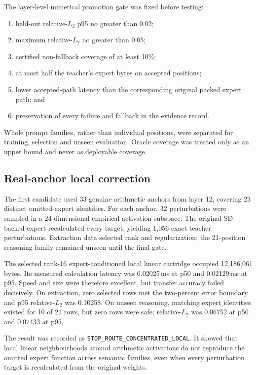 The layer-level numerical promotion gate was fixed before testing:
\begin{enumerate}
  \item held-out relative-$L_2$ p95 no greater than 0.02;
  \item maximum relative-$L_2$ no greater than 0.05;
  \item certified non-fallback coverage of at least 10\%;
  \item at most half the teacher's expert bytes on accepted positions;
  \item lower accepted-path latency than the corresponding original packed
        expert path; and
  \item preservation of every failure and fallback in the evidence record.
\end{enumerate}
Whole prompt families, rather than individual positions, were separated for
training, selection and unseen evaluation.  Oracle coverage was treated only
as an upper bound and never as deployable coverage.

\subsection{Real-anchor local correction}

The first candidate used 33 genuine arithmetic anchors from layer 12,
covering 23 distinct omitted-expert identities.  For each anchor, 32
perturbations were sampled in a 24-dimensional empirical activation subspace.
The original SD-backed expert recalculated every target, yielding 1,056 exact
teacher perturbations.  Extraction data selected rank and regularization; the
21-position reasoning family remained unseen until the final gate.

The selected rank-16 expert-conditioned local linear cartridge occupied
12,186,061 bytes.  Its measured calculation latency was 0.02025\,ms at p50 and
0.02129\,ms at p95.  Speed and size were therefore excellent, but transfer
accuracy failed decisively.  On extraction, zero selected rows met the
two-percent error boundary and p95 relative-$L_2$ was 0.10258.  On unseen
reasoning, matching expert identities existed for 10 of 21 rows, but zero rows
were safe; relative-$L_2$ was 0.06752 at p50 and 0.07433 at p95.

The result was recorded as
\texttt{STOP\_ROUTE\_CONCENTRATED\_LOCAL}.  It showed that local linear
neighbourhoods around arithmetic activations do not reproduce the omitted
expert function across semantic families, even when every perturbation target
is recalculated from the original weights.

